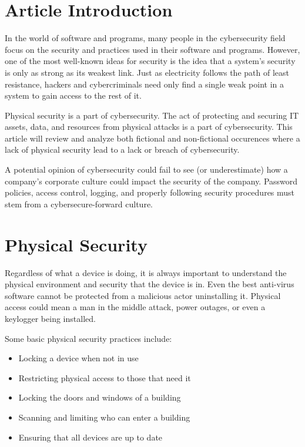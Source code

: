 \documentclass[acmsmall]{acmart}
\begin{document}
\maketitle

\fancyfoot{}
\thispagestyle{empty}

\section{Article Introduction}
In the world of software and programs, many people in the cybersecurity
field focus on the security and practices used in their software and programs.
However, one of the most well-known ideas for security is the idea that
a system's security is only as strong as its weakest link. Just as electricity
follows the path of least resistance, hackers and cybercriminals need only
find a single weak point in a system to gain access to the rest of
it.

Physical security is a part of cybersecurity. The act of protecting and
securing IT assets, data, and resources from physical attacks is a part
of cybersecurity. This article will review and analyze both fictional and
non-fictional occurences where a lack of physical security lead to a lack
or breach of cybersecurity.

A potential opinion of cybersecurity could fail to see (or underestimate) how
a company's corporate culture could impact the security of the company.
Password policies, access control, logging, and properly following
security procedures must stem from a cybersecure-forward culture.

\section{Physical Security}
Regardless of what a device is doing, it is always important to understand
the physical environment and security that the device is in. Even the
best anti-virus software cannot be protected from a malicious actor
uninstalling it. Physical access could mean a man in the middle attack,
power outages, or even a keylogger being installed.

Some basic physical security practices include:
\begin{itemize}
  \item Locking a device when not in use
  \item Restricting physical access to those that need it
  \item Locking the doors and windows of a building
  \item Scanning and limiting who can enter a building
  \item Ensuring that all devices are up to date
\end{itemize}
\end{document}

